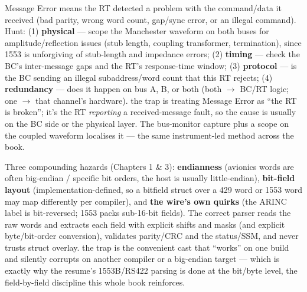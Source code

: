 Message Error means the RT detected a problem with the command/data it received
(bad parity, wrong word count, gap/sync error, or an illegal command). Hunt:
(1) \textbf{physical} --- scope the Manchester waveform on both buses for
amplitude/reflection issues (stub length, coupling transformer, termination),
since 1553 is unforgiving of stub-length and impedance errors; (2)
\textbf{timing} --- check the BC's inter-message gaps and the RT's response-time
window; (3) \textbf{protocol} --- is the BC sending an illegal subaddress/word
count that this RT rejects; (4) \textbf{redundancy} --- does it happen on bus A,
B, or both (both $\rightarrow$ BC/RT logic; one $\rightarrow$ that channel's
hardware). \trap the trap is treating Message Error as ``the RT is broken'';
it's the RT \emph{reporting} a received-message fault, so the cause is usually on
the BC side or the physical layer. The bus-monitor capture plus a scope on the
coupled waveform localises it --- the same instrument-led method across the
book.

Three compounding hazards (Chapters 1 \& 3): \textbf{endianness} (avionics words
are often big-endian / specific bit orders, the host is usually little-endian),
\textbf{bit-field layout} (implementation-defined, so a bitfield struct over a
429 word or 1553 word may map differently per compiler), and \textbf{the
wire's own quirks} (the ARINC label is bit-reversed; 1553 packs sub-16-bit
fields). The correct parser reads the raw words and extracts each field with
explicit shifts and masks (and explicit byte/bit-order conversion), validates
parity/CRC and the status/SSM, and never trusts struct overlay. \trap the trap
is the convenient  cast that ``works'' on one build and
silently corrupts on another compiler or a big-endian target --- which is
exactly why the resume's 1553B/RS422 parsing is done at the bit/byte level, the
field-by-field discipline this whole book reinforces.

